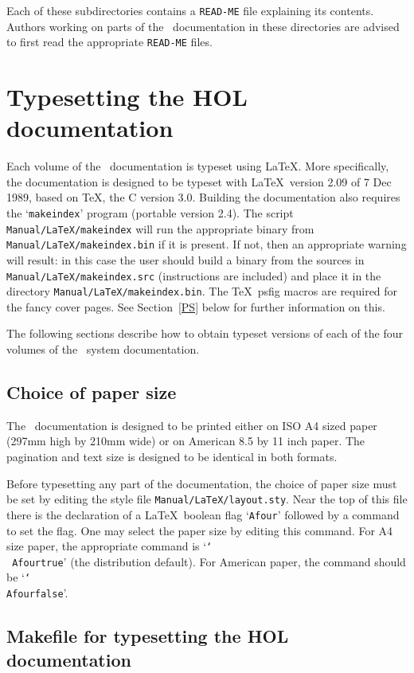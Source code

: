 \documentclass[12pt]{article}
\def\bk{{\tt\char`\\ }}
\begin{document}
\noindent Each of these subdirectories contains a {\tt READ-ME} file explaining
its contents.  Authors working on parts of the \HOL\ documentation in these
directories are advised to first read the appropriate {\tt READ-ME} files.

\section{Typesetting the HOL documentation}

Each volume of the \HOL\ documentation is typeset using \LaTeX.  More
specifically, the documentation is designed to be typeset with \LaTeX\ version
2.09 of 7 Dec 1989, based on \TeX, the C version 3.0. Building the
documentation also requires the `{\tt makeindex}' program (portable version
2.4). The script {\tt Manual/LaTeX/makeindex} will run the appropriate binary
from {\tt Manual/LaTeX/makeindex.bin} if it is present. If not, then an
appropriate warning will result: in this case the user should build a binary
from the sources in {\tt Manual/LaTeX/makeindex.src} (instructions are
included) and place it in the directory {\tt Manual/LaTeX/makeindex.bin}.
The \TeX\ psfig macros are required for the fancy cover pages.  See
Section~\ref{PS} below for further information on this.

The following sections describe how to obtain typeset versions of each of the
four volumes of the \HOL\ system documentation.

\subsection{Choice of paper size}

The \HOL\ documentation is designed to be printed either on ISO A4 sized
paper (297mm high by 210mm wide) or on American 8.5 by 11 inch paper. The
pagination and text size is designed to be identical in both formats.

Before typesetting any part of the documentation, the choice of paper size must
be set by editing the style file {\tt Manual/LaTeX/layout.sty}.  Near the top
of this file there is the declaration of a \LaTeX\ boolean flag `{\tt Afour}'
followed by a command to set the flag. One may select the paper size by editing
this command.  For A4 size paper, the appropriate command is `{\tt \bk
Afourtrue}' (the distribution default).  For American paper, the command should
be `{\tt \bk Afourfalse}'.

\subsection{Makefile for typesetting the HOL documentation}
\end{document}
